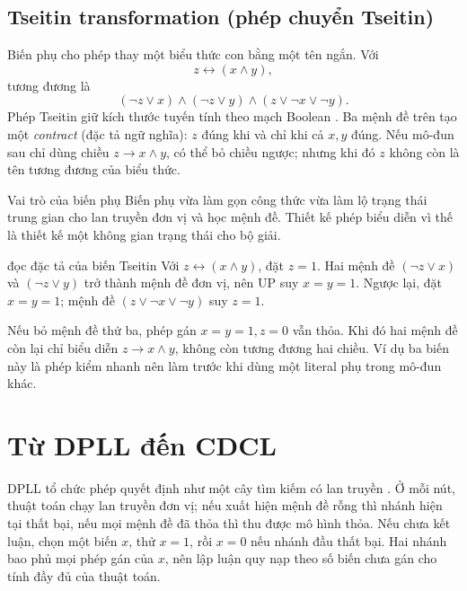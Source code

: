 \subsection{Tseitin transformation (phép chuyển Tseitin)}

Biến phụ cho phép thay một biểu thức con bằng một tên ngắn. Với
\[
  z\leftrightarrow(x\land y),
\]
\CNF tương đương là
\[
  (\neg z\lor x)
  \land
  (\neg z\lor y)
  \land
  (z\lor\neg x\lor\neg y).
\]
Phép Tseitin giữ kích thước tuyến tính theo mạch Boolean
\parencite{tseitin1968}. Ba mệnh đề trên tạo một \emph{contract}
(đặc tả ngữ nghĩa): \(z\) đúng khi và chỉ khi cả \(x,y\) đúng. Nếu mô-đun sau chỉ dùng chiều
\(z\rightarrow x\land y\), có thể bỏ chiều ngược; nhưng khi đó \(z\) không còn
là tên tương đương của biểu thức.

\begin{keyidea}{Vai trò của biến phụ}
Biến phụ vừa làm gọn công thức vừa làm lộ trạng thái trung gian cho lan truyền
đơn vị và học mệnh đề. Thiết kế phép biểu diễn vì thế là thiết kế một không gian
trạng thái cho bộ giải.
\end{keyidea}

\begin{workedexample}{đọc đặc tả của biến Tseitin}
Với \(z\leftrightarrow(x\land y)\), đặt \(z=1\). Hai mệnh đề
\((\neg z\lor x)\) và \((\neg z\lor y)\) trở thành mệnh đề đơn vị, nên UP suy
\(x=y=1\). Ngược lại, đặt \(x=y=1\); mệnh đề
\((z\lor\neg x\lor\neg y)\) suy \(z=1\).

Nếu bỏ mệnh đề thứ ba, phép gán \(x=y=1,z=0\) vẫn thỏa. Khi đó hai mệnh đề còn
lại chỉ biểu diễn \(z\rightarrow x\land y\), không còn tương đương hai chiều.
Ví dụ ba biến này là phép kiểm nhanh nên làm trước khi dùng một literal phụ
trong mô-đun khác.
\end{workedexample}

\section{Từ DPLL đến CDCL}

DPLL tổ chức phép quyết định \SAT như một cây tìm kiếm có lan truyền
\parencite{biere2009handbook}. Ở mỗi nút, thuật toán chạy lan truyền đơn vị;
nếu xuất hiện mệnh đề rỗng thì nhánh hiện tại thất bại, nếu mọi mệnh đề đã thỏa
thì thu được mô hình thỏa. Nếu chưa kết luận, chọn một biến \(x\), thử \(x=1\), rồi
\(x=0\) nếu nhánh đầu thất bại. Hai nhánh bao phủ mọi phép gán của \(x\), nên
lập luận quy nạp theo số biến chưa gán cho tính đầy đủ của thuật toán.

